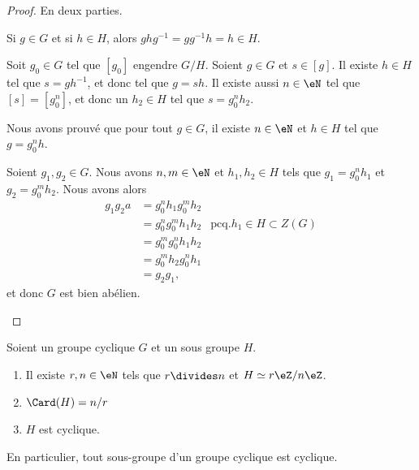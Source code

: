 \begin{proof}
	En deux parties.
	\begin{subproof}
		\spitem[Normal]
		Si \( g\in G\) et si \( h\in H\), alors \( ghg^{-1}=gg^{-1}h=h\in H\).

		\spitem[Abélien]
		Soit \( g_0\in G\) tel que \( [g_0]\) engendre \( G/H\). Soient \( g\in G\) et \( s\in [g]\). Il existe \( h\in H\) tel que \( s=gh^{-1}\), et donc tel que \( g=sh\). Il existe aussi \( n\in \eN\) tel que \( [s]=[g_0^n]\), et donc un \( h_2\in H\) tel que \( s=g_0^nh_2\).

		Nous avons prouvé que pour tout \( g\in G\), il existe \( n\in \eN\) et \( h\in H\) tel que \( g=g_0^nh\).

		Soient \( g_1,g_2\in G\). Nous avons \( n,m\in \eN\) et \( h_1,h_2\in H\) tels que \( g_1=g_0^nh_1\) et \( g_2=g_0^mh_2\). Nous avons alors
		\begin{subequations}
			\begin{align}
				g_1g_2a & =g_0^nh_1g_0^mh_2                                    \\
				        & =g_0^ng_0^mh_1h_2 & \text{pcq.} h_1\in H\subset Z(G) \\
				        & =g_0^mg_0^nh_1h_2                                    \\
				        & =g_0^mh_2g_0^nh_1                                    \\
				        & =g_2g_1,
			\end{align}
		\end{subequations}
		et donc \( G\) est bien abélien.
	\end{subproof}
\end{proof}


\begin{lemma}     \label{LEMooZJGVooRYrujB}
	Soient un groupe cyclique \( G\) et un sous groupe \( H\).
	\begin{enumerate}
		\item       \label{ITEMooUNOEooZoElYL}
		      Il existe \( r,n\in\eN\) tels que \( r\divides n\) et \( H\simeq r\eZ/n\eZ\).
		\item       \label{ITEMooMUSSooBmNXEd}
		      \( \Card(H)=n/r\)
		\item       \label{ITEMooVPEKooKdPibk}
		      \( H\) est cyclique.
	\end{enumerate}
	En particulier, tout sous-groupe d'un groupe cyclique est cyclique.
\end{lemma}

